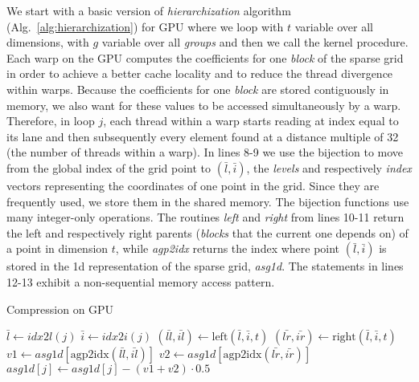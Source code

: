 We start with a basic version of \textit{hierarchization} algorithm
(Alg.~\ref{alg:hierarchization}) for GPU where we loop with $t$ variable over
all dimensions, with $g$ variable over all \textit{groups} and then we call the
kernel procedure. Each warp on the GPU computes the coefficients for one
\textit{block} of the sparse grid in order to achieve a better cache locality
and to reduce the thread divergence within warps. Because the coefficients for
one \textit{block} are stored contiguously in memory, we also want for these
values to be accessed simultaneously by a warp. Therefore, in loop $j$, each
thread within a warp starts reading at index equal to its lane and then
subsequently every element found at a distance multiple of 32 (the number of
threads within a warp). In lines 8-9 we use the bijection to move from the
global index of the grid point to $(\bar{l}, \bar{i})$, the \textit{levels} and
respectively \textit{index} vectors representing the coordinates of one point in
the grid. Since they are frequently used, we store them in the shared memory.
The bijection functions use many integer-only operations. The routines
\textit{left} and \textit{right} from lines 10-11 return the left and
respectively right parents (\textit{blocks} that the current one depends on) of
a point in dimension $t$, while \textit{agp2idx} returns the index where point
$(\bar{l}, \bar{i})$ is stored in the 1d representation of the sparse grid,
\textit{asg1d}. The statements in lines 12-13 exhibit a non-sequential memory
access pattern.

\begin{algorithm}[t]
\small{
	\caption{Compression on GPU}
 	\label{alg:hierarchization}                       

 	\begin{algorithmic}[1]
 				\State {}
 			\EndFor
 		\EndFor

	 				\State $\bar{l} \leftarrow idx2l(j)$
	 			\EndIf
	 			\State $\bar{i} \leftarrow idx2i(j)$
	 			\State $(\bar{ll}, \bar{il}) \leftarrow \text{left}(\bar{l},\bar{i}, t)$
	 			\State $(\bar{lr}, \bar{ir}) \leftarrow \text{right}(\bar{l},\bar{i}, t)$
	 			\State $v1 \leftarrow \textit{asg1d}[\text{agp2idx}(\bar{ll},\bar{il})]$ 
	 			\State $v2 \leftarrow \textit{asg1d}[\text{agp2idx}(\bar{lr},\bar{ir})]$ 
	 			\State $\textit{asg1d}[j] \leftarrow \textit{asg1d}[j] - (v1 + v2) \cdot 0.5$
			\EndFor
		\EndProcedure
	\end{algorithmic}
}
\end{algorithm}

